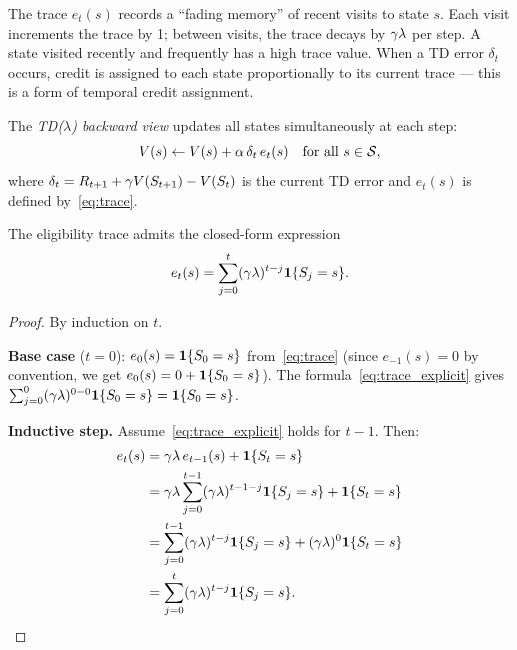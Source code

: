 \documentclass[11pt,a4paper]{article}
\begin{document}
\begin{remark}
\label{rem:trace_intuition}
The trace $e_t(s)$ records a ``fading memory'' of recent visits to
state $s$. Each visit increments the trace by 1; between visits, the
trace decays by $\gamma\lambda$ per step. A state visited recently
and frequently has a high trace value. When a TD error $\delta_t$
occurs, credit is assigned to each state proportionally to its current
trace --- this is a form of temporal credit assignment.
\end{remark}

\begin{definition}
\label{def:backward_update}
The \emph{TD($\lambda$) backward view} updates all states
simultaneously at each step:
\begin{equation}
  V(s) \leftarrow V(s) + \alpha\,\delta_t\,e_t(s)
  \quad \text{for all } s \in \mathcal{S},
  \label{eq:backward_update}
\end{equation}
where $\delta_t = R_{t+1} + \gamma V(S_{t+1}) - V(S_t)$ is the
current TD error and $e_t(s)$ is defined by~\eqref{eq:trace}.
\end{definition}

\begin{lemma}
\label{lem:trace_explicit}
The eligibility trace admits the closed-form expression
\begin{equation}
  e_t(s) = \sum_{j=0}^{t} (\gamma\lambda)^{t-j}
  \mathbf{1}\{S_j = s\}.
  \label{eq:trace_explicit}
\end{equation}
\end{lemma}

\begin{proof}
By induction on $t$.

\textbf{Base case} ($t = 0$): $e_0(s) = \mathbf{1}\{S_0 = s\}$
from~\eqref{eq:trace} (since $e_{-1}(s) = 0$ by convention, we get
$e_0(s) = 0 + \mathbf{1}\{S_0 = s\}$). The
formula~\eqref{eq:trace_explicit} gives
$\sum_{j=0}^0 (\gamma\lambda)^{0-0} \mathbf{1}\{S_0 = s\}
= \mathbf{1}\{S_0 = s\}$. \checkmark

\textbf{Inductive step.} Assume~\eqref{eq:trace_explicit} holds for
$t - 1$. Then:
\begin{align}
  e_t(s)
  &= \gamma\lambda\,e_{t-1}(s) + \mathbf{1}\{S_t = s\}
     \nonumber\\
  &= \gamma\lambda \sum_{j=0}^{t-1}
     (\gamma\lambda)^{t-1-j} \mathbf{1}\{S_j = s\}
     + \mathbf{1}\{S_t = s\} \nonumber\\
  &= \sum_{j=0}^{t-1} (\gamma\lambda)^{t-j}
     \mathbf{1}\{S_j = s\}
     + (\gamma\lambda)^0 \mathbf{1}\{S_t = s\} \nonumber\\
  &= \sum_{j=0}^{t} (\gamma\lambda)^{t-j}
     \mathbf{1}\{S_j = s\}. \qedhere
\end{align}
\end{proof}
\end{document}
